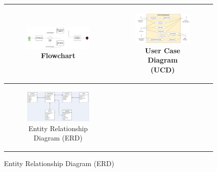 \begin{figure}[ht]
    \centering
	\begin{tabular}{|c|c|}
		\hline
		\begin{subfigure}[b]{0.44\textwidth}
			\centering
			\includegraphics[width=0.9\linewidth]{mainmatter/images/exampleflowchart.jpeg}
			\caption{Flowchart}
         	\label{fig:myfig31}
		\end{subfigure} & 
		\begin{subfigure}[b]{0.44\textwidth}
			\centering
			\vspace{0.2cm}
			\includegraphics[width=0.7\linewidth]{mainmatter/images/exampleucd.png}
			\caption{User Case Diagram (UCD)}
         	\label{fig:myfig32}
		\end{subfigure}	\\
		\hline
		\begin{subfigure}[b]{0.44\textwidth}
			\centering
			\includegraphics[width=0.8\linewidth]{mainmatter/images/exampleerd.png}
			\caption{Entity Relationship Diagram (ERD)}
         	\label{fig:myfig33}
		\end{subfigure} & 

\end{tabular}
\end{figure}
